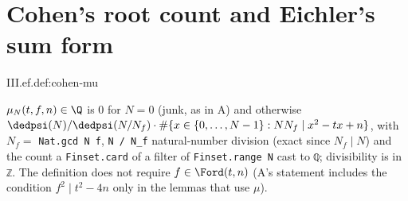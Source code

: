 \section{Cohen's root count and Eichler's sum form}\label{sec:ef-cohen}

\begin{definition}
\end{definition}
\begin{tfformal}{III.ef.def:cohen-mu}
\begin{tffidelity}
$\mu_N(t,f,n)\in\Q$ is $0$ for $N=0$ (junk, as in A) and otherwise $\dedpsi(N)/\dedpsi(N/N_f)\cdot\#\{x\in\{0,\dots,N-1\}:NN_f\mid x^2-tx+n\}$, with $N_f=$ \texttt{Nat.gcd N f}, \texttt{N / N\_f} natural-number division (exact since $N_f\mid N$) and the count a \texttt{Finset.card} of a filter of \texttt{Finset.range N} cast to \texttt{ℚ}; divisibility is in \texttt{ℤ}. The definition does not require $f\in\Ford(t,n)$ (A's statement includes the condition $f^2\mid t^2-4n$ only in the lemmas that use $\mu$).
\end{tffidelity}
\end{tfformal}

